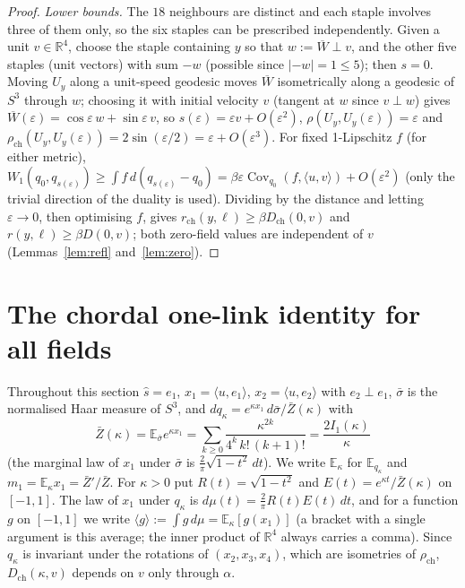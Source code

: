\documentclass[11pt,a4paper]{article}
\theoremstyle{remark}
\theoremstyle{definition}
\theoremstyle{plain}
\theoremstyle{remark}
\newcommand{\R}{\mathbb{R}}
\newcommand{\E}{\mathbb{E}}
\newcommand{\Cov}{\operatorname{Cov}}
\newcommand{\Zb}{\bar Z}
\newcommand{\Dch}{D_{\mathrm{ch}}}
\newcommand{\rch}{\rho_{\mathrm{ch}}}
\begin{document}
\begin{proof}
\emph{Lower bounds.} The $18$ neighbours are distinct and each staple involves three of them only, so the
six staples can be prescribed independently. Given a unit $v\in\R^4$, choose the staple containing $y$ so
that $w:=\overline{W}\perp v$, and the other five staples (unit vectors) with sum $-w$ (possible since
$|{-w}|=1\le5$); then $s=0$. Moving $U_y$ along a unit-speed geodesic moves $\overline W$ isometrically along
a geodesic of $S^3$ through $w$; choosing it with initial velocity $v$ (tangent at $w$ since $v\perp w$)
gives $\overline W(\varepsilon)=\cos\varepsilon\,w+\sin\varepsilon\,v$, so $s(\varepsilon)=\varepsilon v+O(\varepsilon^2)$,
$\rho(U_y,U_y(\varepsilon))=\varepsilon$ and $\rch(U_y,U_y(\varepsilon))=2\sin(\varepsilon/2)=\varepsilon+O(\varepsilon^3)$.
For fixed 1-Lipschitz $f$ (for either metric),
$W_1(q_0,q_{s(\varepsilon)})\ge\int f\,d(q_{s(\varepsilon)}-q_0)=\beta\varepsilon\Cov_{q_0}(f,\langle u,v\rangle)
+O(\varepsilon^2)$ (only the trivial direction of the duality is used). Dividing by the distance and
letting $\varepsilon\to0$, then optimising $f$, gives $r_{\mathrm{ch}}(y,\ell)\ge\beta\Dch(0,v)$ and
$r(y,\ell)\ge\beta D(0,v)$; both zero-field values are independent of $v$ (Lemmas~\ref{lem:refl}
and~\ref{lem:zero}).
\end{proof}

\section{The chordal one-link identity for all fields}\label{sec:chordal}

Throughout this section $\hat s=e_1$, $x_1=\langle u,e_1\rangle$, $x_2=\langle u,e_2\rangle$ with $e_2\perp e_1$,
$\bar\sigma$ is the normalised Haar measure of $S^3$, and $dq_\kappa=e^{\kappa x_1}\,d\bar\sigma/\Zb(\kappa)$ with
\[
\Zb(\kappa)=\E_{\bar\sigma}e^{\kappa x_1}=\sum_{k\ge0}\frac{\kappa^{2k}}{4^k\,k!\,(k+1)!}=\frac{2I_1(\kappa)}{\kappa}
\]
(the marginal law of $x_1$ under $\bar\sigma$ is $\frac2\pi\sqrt{1-t^2}\,dt$). We write $\E_\kappa$ for $\E_{q_\kappa}$ and
$m_1=\E_\kappa x_1=\Zb'/\Zb$. For $\kappa>0$ put $R(t)=\sqrt{1-t^2}$ and $E(t)=e^{\kappa t}/\Zb(\kappa)$ on $[-1,1]$.
The law of $x_1$ under $q_\kappa$ is $d\mu(t)=\frac2\pi R(t)E(t)\,dt$, and for a function $g$ on $[-1,1]$ we write
$\langle g\rangle:=\int g\,d\mu=\E_\kappa[g(x_1)]$ (a bracket with a single argument is this average; the inner product
of $\R^4$ always carries a comma). Since $q_\kappa$ is invariant under the rotations of $(x_2,x_3,x_4)$, which are
isometries of $\rch$, $\Dch(\kappa,v)$ depends on $v$ only through $\alpha$.
\end{document}
